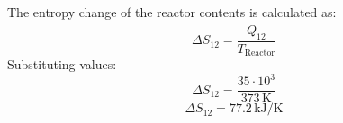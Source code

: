 The entropy change of the reactor contents is calculated as:  
\[
\Delta S_{12} = \frac{\dot{Q}_{12}}{T_{\text{Reactor}}}
\]  
Substituting values:  
\[
\Delta S_{12} = \frac{35 \cdot 10^3}{373 \, \text{K}}
\]  
\[
\Delta S_{12} = 77.2 \, \text{kJ/K}
\]